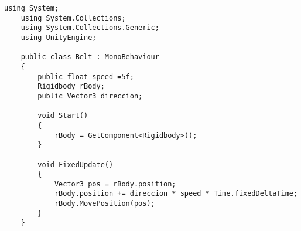 \begin{lstlisting}[frame=single]
    using System;
    using System.Collections;
    using System.Collections.Generic;
    using UnityEngine;

    public class Belt : MonoBehaviour
    {
        public float speed =5f;
        Rigidbody rBody;
        public Vector3 direccion;

        void Start()
        {
            rBody = GetComponent<Rigidbody>();
        }

        void FixedUpdate()
        {
            Vector3 pos = rBody.position;
            rBody.position += direccion * speed * Time.fixedDeltaTime;
            rBody.MovePosition(pos);
        }
    }
\end{lstlisting}